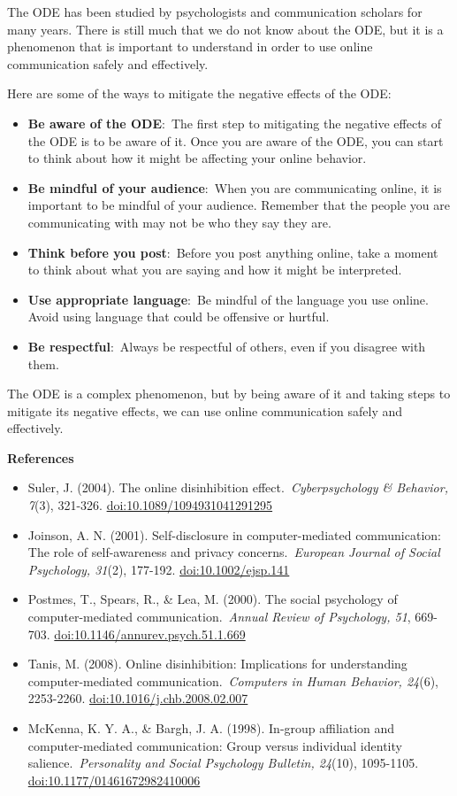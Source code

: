 \documentclass[
]{book}
\begin{document}
The ODE has been studied by psychologists and communication scholars for many years. There is still much that we do not know about the ODE, but it is a phenomenon that is important to understand in order to use online communication safely and effectively.

Here are some of the ways to mitigate the negative effects of the ODE:

\begin{itemize}
\item
  \textbf{Be aware of the ODE}:~The first step to mitigating the negative effects of the ODE is to be aware of it. Once you are aware of the ODE, you can start to think about how it might be affecting your online behavior.
\item
  \textbf{Be mindful of your audience}:~When you are communicating online, it is important to be mindful of your audience. Remember that the people you are communicating with may not be who they say they are.
\item
  \textbf{Think before you post}:~Before you post anything online, take a moment to think about what you are saying and how it might be interpreted.
\item
  \textbf{Use appropriate language}:~Be mindful of the language you use online. Avoid using language that could be offensive or hurtful.
\item
  \textbf{Be respectful}:~Always be respectful of others, even if you disagree with them.
\end{itemize}

The ODE is a complex phenomenon, but by being aware of it and taking steps to mitigate its negative effects, we can use online communication safely and effectively.

\textbf{References}

\begin{itemize}
\item
  Suler, J. (2004). The online disinhibition effect.~\emph{Cyberpsychology \& Behavior, 7}(3), 321-326. \url{doi:10.1089/1094931041291295}
\item
  Joinson, A. N. (2001). Self-disclosure in computer-mediated communication: The role of self-awareness and privacy concerns.~\emph{European Journal of Social Psychology, 31}(2), 177-192. \url{doi:10.1002/ejsp.141}
\item
  Postmes, T., Spears, R., \& Lea, M. (2000). The social psychology of computer-mediated communication.~\emph{Annual Review of Psychology, 51}, 669-703. \url{doi:10.1146/annurev.psych.51.1.669}
\item
  Tanis, M. (2008). Online disinhibition: Implications for understanding computer-mediated communication.~\emph{Computers in Human Behavior, 24}(6), 2253-2260. \url{doi:10.1016/j.chb.2008.02.007}
\item
  McKenna, K. Y. A., \& Bargh, J. A. (1998). In-group affiliation and computer-mediated communication: Group versus individual identity salience.~\emph{Personality and Social Psychology Bulletin, 24}(10), 1095-1105. \url{doi:10.1177/01461672982410006}
\end{itemize}
\end{document}
